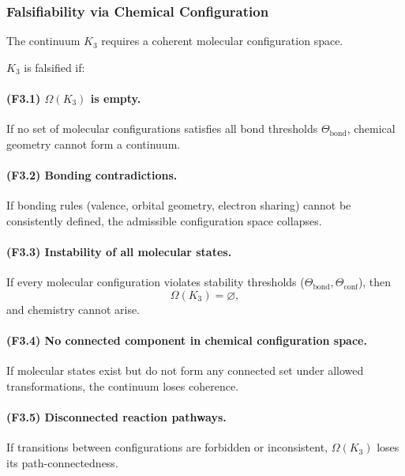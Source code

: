 \subsubsection{Falsifiability via Chemical Configuration}

The continuum $K_3$ requires a coherent molecular configuration space.

$K_3$ is falsified if:

\paragraph{(F3.1) \texorpdfstring{$\Omega(K_3)$}{\Omega(K_3)} is empty.}
If no set of molecular configurations satisfies all bond thresholds
$\Theta_{\mathrm{bond}}$, chemical geometry cannot form a continuum.

\paragraph{(F3.2) Bonding contradictions.}
If bonding rules (valence, orbital geometry, electron sharing) cannot be
consistently defined, the admissible configuration space collapses.

\paragraph{(F3.3) Instability of all molecular states.}
If every molecular configuration violates stability thresholds
($\Theta_{\mathrm{bond}}, \Theta_{\mathrm{conf}}$), then
\[
\Omega(K_3)=\varnothing,
\]
and chemistry cannot arise.

\paragraph{(F3.4) No connected component in chemical configuration
space.}
If molecular states exist but do not form any connected set under
allowed transformations, the continuum loses coherence.

\paragraph{(F3.5) Disconnected reaction pathways.}
If transitions between configurations are forbidden or inconsistent,
$\Omega(K_3)$ loses its path-connectedness.



